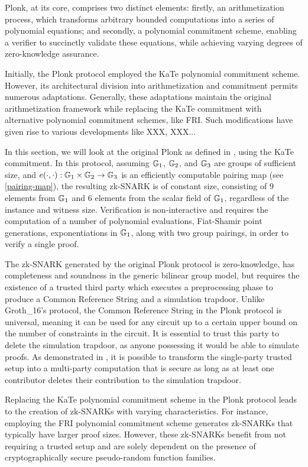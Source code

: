Plonk, at its core, comprises two distinct elements: firstly, an arithmetization process, which transforms arbitrary bounded computations into  a series of polynomial equations; and secondly, a polynomial commitment scheme, enabling a verifier to succinctly validate these equations, while achieving varying degrees of zero-knowledge assurance.

Initially, the Plonk protocol employed the KaTe polynomial commitment scheme. However, its architectural division into arithmetization and commitment permits numerous adaptations. Generally, these adaptations maintain the original arithmetization framework while replacing the KaTe commitment with alternative polynomial commitment schemes, like FRI. Such modifications have given rise to various developments like XXX, XXX...

In this section, we will look at the original Plonk as defined in \cite{gabizon-19}, using the KaTe commitment. In this protocol, assuming $\mathbb{G}_1$, $\mathbb{G}_2$, and $\mathbb{G}_3$ are groups of sufficient size, and $e(\cdot,\cdot): \mathbb{G}_1 \times \mathbb{G}_2 \to \mathbb{G}_3$ is an efficiently computable pairing map (see \ref{pairing-map}), the resulting zk-SNARK is of constant size, consisting of $9$ elements from $\mathbb{G}_1$ and $6$ elements from the scalar field of $\mathbb{G}_1$, regardless of the instance and witness size. Verification is non-interactive and requires the computation of a number of polynomial evaluations, Fiat-Shamir point generations, exponentiations in $\mathbb{G}_1$, along with two group pairings, in order to verify a single proof.

The zk-SNARK generated by the original Plonk protocol is zero-knowledge, has completeness and soundness in the generic bilinear group model, but requires the existence of a trusted third party which executes a preprocessing phase to produce a Common Reference String and a simulation trapdoor. Unlike Groth\_16's protocol, the Common Reference String in the Plonk protocol is universal, meaning it can be used for any circuit up to a certain upper bound on the number of constraints in the circuit. It is essential to trust this party to delete the simulation trapdoor, as anyone possessing it would be able to simulate proofs. As demonstrated in \cite{bowe-17}, it is possible to transform the single-party trusted setup into a multi-party computation that is secure as long as at least one contributor deletes their contribution to the simulation trapdoor. 

Replacing the KaTe polynomial commitment scheme in the Plonk protocol leads to the creation of zk-SNARKs with varying characteristics. For instance, employing the FRI polynomial commitment scheme generates zk-SNARKs that typically have larger proof sizes. However, these zk-SNARKs benefit from not requiring a trusted setup and are solely dependent on the presence of cryptographically secure pseudo-random function families.

